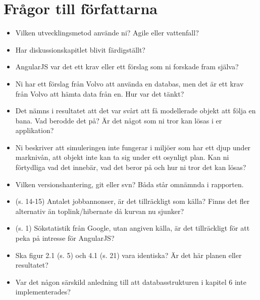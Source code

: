 \section{Frågor till författarna} %
\label{sec:fr_gor_till_f_rfattarna}

\begin{itemize}
    \item Vilken utvecklingsmetod använde ni? Agile eller vattenfall?
    \item Har diskussionskapitlet blivit färdigställt?
    \item AngularJS var det ett krav eller ett förslag som ni forskade fram själva?
    \item Ni har ett förslag från Volvo att använda en databas, men det är ett krav från Volvo att hämta data från en. Hur var det tänkt?
    \item Det nämns i resultatet att det var svårt att få modellerade objekt att följa en bana. Vad berodde det på? Är det något som ni tror kan lösas i er applikation?
    \item Ni beskriver att simuleringen inte fungerar i miljöer som har ett djup under marknivån, att objekt inte kan ta sig under ett osynligt plan. Kan ni förtydliga vad det innebär, vad det beror på och hur ni tror det kan lösas?
    \item Vilken versionshantering, git eller svn? Båda står omnämnda i rapporten.
    \item (s. 14-15) Antalet jobbannonser, är det tillräckligt som källa? Finns det fler alternativ än toplink/hibernate då kurvan nu sjunker?
    \item (s. 1) Sökstatistik från Google, utan angiven källa, är det tillräckligt för att peka på intresse för AngularJS?
    \item Ska figur 2.1 (s. 5) och 4.1 (s. 21) vara identiska?  Är det här planen eller resultatet?
    \item Var det någon särskild anledning till att databasstrukturen i kapitel 6 inte implementerades?

\end{itemize}

